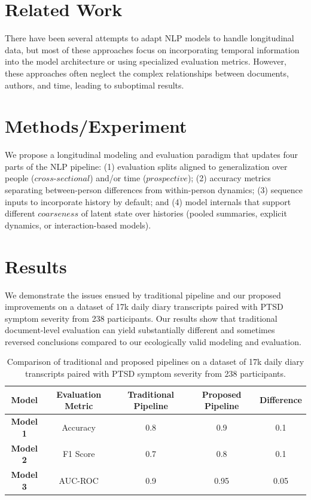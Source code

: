 \documentclass[12pt]{article}
\begin{document}
\section{Related Work}
\label{sec:related_work}
There have been several attempts to adapt NLP models to handle longitudinal data, but most of these approaches focus on incorporating temporal information into the model architecture or using specialized evaluation metrics. However, these approaches often neglect the complex relationships between documents, authors, and time, leading to suboptimal results.

\section{Methods/Experiment}
\label{sec:methods}
We propose a longitudinal modeling and evaluation paradigm that updates four parts of the NLP pipeline: (1) evaluation splits aligned to generalization over people ($\textit{cross-sectional}$) and/or time ($\textit{prospective}$); (2) accuracy metrics separating between-person differences from within-person dynamics; (3) sequence inputs to incorporate history by default; and (4) model internals that support different $\textit{coarseness}$ of latent state over histories (pooled summaries, explicit dynamics, or interaction-based models).

\section{Results}
\label{sec:results}
We demonstrate the issues ensued by traditional pipeline and our proposed improvements on a dataset of 17k daily diary transcripts paired with PTSD symptom severity from 238 participants. Our results show that traditional document-level evaluation can yield substantially different and sometimes reversed conclusions compared to our ecologically valid modeling and evaluation.

\begin{table}[h]
\centering
\begin{tabular}{|c|c|c|c|c|}
\hline
\textbf{Model} & \textbf{Evaluation Metric} & \textbf{Traditional Pipeline} & \textbf{Proposed Pipeline} & \textbf{Difference} \\
\hline
\textbf{Model 1} & Accuracy & 0.8 & 0.9 & 0.1 \\
\hline
\textbf{Model 2} & F1 Score & 0.7 & 0.8 & 0.1 \\
\hline
\textbf{Model 3} & AUC-ROC & 0.9 & 0.95 & 0.05 \\
\hline
\end{tabular}
\caption{Comparison of traditional and proposed pipelines on a dataset of 17k daily diary transcripts paired with PTSD symptom severity from 238 participants.}
\label{tab:results}
\end{table}
\end{document}
